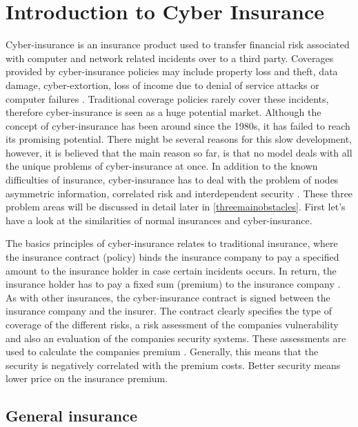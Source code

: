 \chapter{Introduction to Cyber Insurance}
\label{chp:introductionToCyberInsurance} 


Cyber-insurance is an insurance product used to transfer financial risk
associated with computer and network related incidents over to a third party.
 Coverages provided by cyber-insurance policies may include property loss and
theft, data damage, cyber-extortion, loss of income due to denial of service attacks or computer failures \cite{washingtonpaper}.
Traditional coverage policies rarely cover these incidents, therefore cyber-insurance is seen as a huge potential market. Although the concept of cyber-insurance has been around since the 1980s, it has failed to reach its promising potential. There might be several reasons for this slow development, however, it is believed that the main reason so far, is that no model deals with all the unique problems of cyber-insurance at once. In addition to the known difficulties of insurance, cyber-insurance has to deal with the problem of nodes asymmetric information, correlated risk and interdependent security \cite{networkgames}. These three problem areas will be discussed in detail later in \ref{threemainobstacles}. First let's have a look at the similarities of normal insurances and cyber-insurance. 
  
The basics principles of cyber-insurance relates to traditional insurance, where the insurance contract (policy)
 binds the insurance company to pay a specified amount to the insurance holder in case certain incidents
  occurs. In return, the insurance holder has to pay a fixed sum (premium) to the insurance company
   \cite{robinson2012incentives}.
    As with other insurances, the cyber-insurance contract is signed between the insurance company and
     the insurer. The contract clearly specifies the type of coverage of the different risks, a risk
      assessment of the companies vulnerability and also an evaluation of the companies security
       systems. These assessments are used to calculate the companies premium \cite{robinson2012incentives}. Generally, this means that the security is negatively correlated with the premium costs. Better security means lower price on the insurance premium. 

\section{General insurance}


